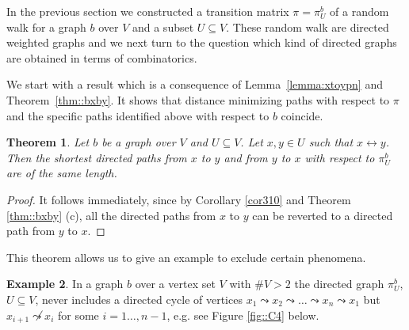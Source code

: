\documentclass[a4paper,oneside, 12pt]{amsart}
\newtheorem{theorem}{Theorem}
\numberwithin{theorem}{section}
\theoremstyle{definition}
\newtheorem{example}[theorem]{Example}
\newcommand{\subsV}{U}
\begin{document}
{In the previous section we constructed a transition matrix $\pi= \pi_{U}^{b} $ of a random walk  for a graph $ b $ over $ V $ and a subset $ \subsV\subseteq V $. These random walk are directed weighted graphs and we next turn to the question which kind of directed graphs are obtained in terms of combinatorics.


We start with  a result which is a consequence of Lemma~\ref{lemma:xtoypn} and Theorem~\ref{thm::bxby}. It shows that distance minimizing paths with respect to $ \pi $ and the specific paths identified above with respect to $ b $ coincide.


\begin{theorem}\label{thm::directedpath} Let $b$ be a  graph over $V$ and $\subsV\subseteq V$.  Let  $x,y\in \subsV$ such that $x\leftrightarrow y$. Then the shortest directed paths from $x$ to $y$ and from $y$ to $x$ with respect to  $\pi_{\subsV}^{b}$ are of the same length. 
\end{theorem}
\begin{proof}
	It follows immediately, since by Corollary \ref{cor310} and Theorem \ref{thm::bxby} (c),  all the directed paths from $x$ to $y$ can be reverted to a directed path from $ y  $ to $ x$.
\end{proof}


This theorem allows us to give an example to exclude certain phenomena.


\begin{example}
In a graph $ b $ over a vertex set $ V$	with $\#V>2$ 
the directed graph $\pi_{U}^{b}$, $U\subseteq V$,  never includes a directed cycle of vertices $ x_1\leadsto x_2\leadsto \dots \leadsto x_n\leadsto x_{1} $ but  $ x_{i+1}\not\leadsto x_{i} $ for some $ i=1\ldots, n-1 $, e.g. see Figure \ref{fig::C4} below.
\begin{figure}[H]
\centering
{}
\end{figure}
\end{example}}
\end{document}
